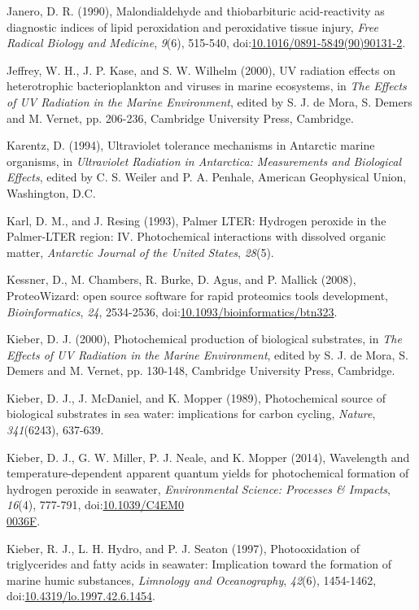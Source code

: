 \begin{singlespace}
{{Janero, D. R. (1990), Malondialdehyde and thiobarbituric acid-reactivity as diagnostic indices of lipid peroxidation and peroxidative tissue injury, \emph{Free Radical Biology and Medicine}, \emph{9}(6), 515-540, doi:\href{http://dx.doi.org/10.1016/0891-5849(90)90131-2}{10.1016/0891-5849(90)90131-2}.

Jeffrey, W. H., J. P. Kase, and S. W. Wilhelm (2000), UV radiation effects on heterotrophic bacterioplankton and viruses in marine ecosystems, in \emph{The Effects of UV Radiation in the Marine Environment}, edited by S. J. de Mora, S. Demers and M. Vernet, pp. 206-236, Cambridge University Press, Cambridge.

Karentz, D. (1994), Ultraviolet tolerance mechanisms in Antarctic marine organisms, in \emph{Ultraviolet Radiation in Antarctica: Measurements and Biological Effects}, edited by C. S. Weiler and P. A. Penhale, American Geophysical Union, Washington, D.C.

Karl, D. M., and J. Resing (1993), Palmer LTER: Hydrogen peroxide in the Palmer-LTER region: IV. Photochemical interactions with dissolved organic matter, \emph{Antarctic Journal of the United States}, \emph{28}(5).

Kessner, D., M. Chambers, R. Burke, D. Agus, and P. Mallick (2008), ProteoWizard: open source software for rapid proteomics tools development, \emph{Bioinformatics}, \emph{24}, 2534-2536, doi:\href{http://dx.doi.org/10.1093/bioinformatics/btn323}{10.1093/bioinformatics/btn323}.

Kieber, D. J. (2000), Photochemical production of biological substrates, in \emph{The Effects of UV Radiation in the Marine Environment}, edited by S. J. de Mora, S. Demers and M. Vernet, pp. 130-148, Cambridge University Press, Cambridge.

Kieber, D. J., J. McDaniel, and K. Mopper (1989), Photochemical source of biological substrates in sea water: implications for carbon cycling, \emph{Nature}, \emph{341}(6243), 637-639.

Kieber, D. J., G. W. Miller, P. J. Neale, and K. Mopper (2014), Wavelength and temperature-dependent apparent quantum yields for photochemical formation of hydrogen peroxide in seawater, \emph{Environmental Science: Processes \& Impacts}, \emph{16}(4), 777-791, doi:\href{http://dx.doi.org/10.1039/C4EM00036F}{10.1039/C4EM0\\0036F}.

Kieber, R. J., L. H. Hydro, and P. J. Seaton (1997), Photooxidation of triglycerides and fatty acids in seawater: Implication toward the formation of marine humic substances, \emph{Limnology and Oceanography}, \emph{42}(6), 1454-1462, doi:\href{http://dx.doi.org/10.4319/lo.1997.42.6.1454}{10.4319/lo.1997.42.6.1454}.

}}
\end{singlespace}
